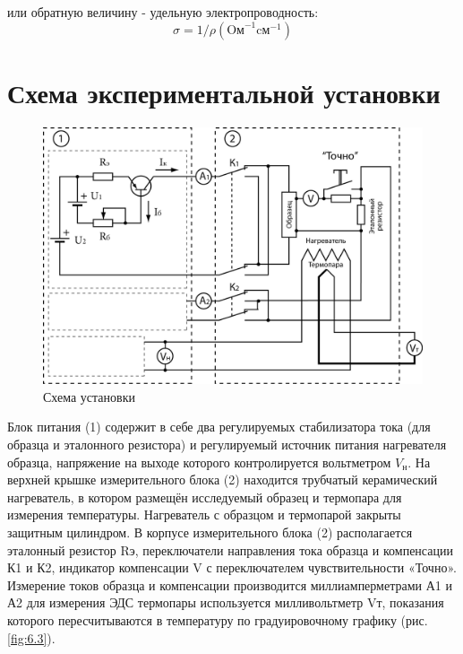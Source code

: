 или обратную величину - удельную электропроводность: 
$$\sigma=1 / \rho\left(\text{Oм}^{-1} \text{cм}^{-1}\right)$$

\section{Схема экспериментальной установки}

\begin{figure}[h!]
	\centering
	\includegraphics[width = .8\linewidth]{img/scheme-2.jpg}
	\caption{Схема установки}
	\label{fig:6.2}
\end{figure}

Блок питания (1) содержит в себе два регулируемых стабилизатора тока (для образца и эталонного резистора) и регулируемый
источник питания нагревателя образца, напряжение на выходе которого контролируется вольтметром $V_\text{н}$. На верхней
крышке измерительного блока (2) находится трубчатый керамический нагреватель, в котором размещён исследуемый образец и
термопара для измерения температуры. Нагреватель с образцом и термопарой закрыты защитным цилиндром. В корпусе
измерительного блока (2) располагается эталонный резистор Rэ, переключатели направления тока образца и компенсации К1 и
К2, индикатор компенсации V с переключателем чувствительности «Точно». Измерение токов образца и компенсации
производится миллиамперметрами А1 и А2 для измерения ЭДС термопары используется милливольтметр Vт, показания которого
пересчитываются в температуру по градуировочному графику (рис. \ref{fig:6.3}).

